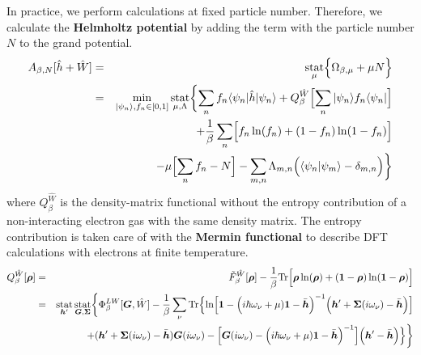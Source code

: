 \documentclass[11pt,a4paper]{report}
\begin{document}
In practice, we perform calculations at fixed particle
number. Therefore, we calculate the \textbf{Helmholtz
  potential} by adding the term with the
particle number $N$ to the grand potential.
\begin{eqnarray}
A_{\beta,N}[\hat{h}+\hat{W}]
&=&\operatorname*{stat}_\mu\Bigl\lbrace\Omega_{\beta,\mu}+\mu N\Bigr\rbrace
\nonumber\\
&=&\min_{|\psi_n\rangle,f_n\in[0,1]}\operatorname*{stat}_{\mu,\Lambda}
\biggl\lbrace\sum_n f_n\langle\psi_n|\hat{h}|\psi_n\rangle
+Q_\beta^{\hat{W}}\Bigl[\sum_n|\psi_n\rangle f_n\langle\psi_n|\Bigr]
\nonumber\\
&&+\frac{1}{\beta}\sum_n\Bigl[f_n\ln(f_n)+(1-f_n)\ln(1-f_n)\Bigr]
\nonumber\\
&&
-\mu\Bigl[\sum_n f_n-N\Bigr]
-\sum_{m,n}\Lambda_{m,n}\Bigl(\langle\psi_n|\psi_m\rangle-\delta_{m,n}\Bigr)
\biggr\rbrace
\label{eq:hp}
\end{eqnarray}
where $Q^{\hat{W}}_\beta$ is the density-matrix functional without the
entropy contribution of a non-interacting electron gas with the same
density matrix.  The entropy contribution is taken care of with the
\textbf{Mermin functional}\cite{mermin65_pr137_a1441} to describe DFT calculations
with electrons at finite temperature.
\begin{eqnarray}
Q^{\hat{W}}_\beta[\bm{\rho}]
&=&\tilde{F}^{\hat{W}}_\beta[\bm{\rho}]
-
\frac{1}{\beta}\mathrm{Tr}\Bigl[
\bm{\rho}\ln(\bm{\rho})+(\bm{1}-\bm{\rho})\ln(\bm{1}-\bm{\rho})\Bigr]
\nonumber\\
&=&
\operatorname*{stat}_{\bm{h}'}\operatorname*{stat}_{\bm{G},\bm{\Sigma}}
\biggl\lbrace
\Phi^{LW}_\beta[\bm{G},\hat{W}]
-\frac{1}{\beta}\sum_\nu\mathrm{Tr}\Bigl\lbrace
\ln\Bigl[
\bm{1}-
\Bigl(i\hbar\omega_\nu+\mu)\bm{1}-\bar{\bm{h}}\Bigr)^{-1}
\Bigl(\bm{h}'+\bm{\Sigma}(i\omega_\nu)-\bar{\bm{h}}\Bigr)
\Bigr]
\nonumber\\&&
+(\bm{h}'+\bm{\Sigma}(i\omega_\nu)-\bar{\bm{h}})\bm{G}(i\omega_\nu)
-
\Bigl[
\bm{G}(i\omega_\nu)
-\Bigl(i\hbar\omega_\nu+\mu)\bm{1}-\bar{\bm{h}}\Bigr)^{-1}
\Bigr]
\Bigl(\bm{h}'-\bar{\bm{h}}\Bigr)\Bigr\rbrace
\biggr\rbrace
\label{eq:dmfQgreen}
\end{eqnarray}

\end{document}
